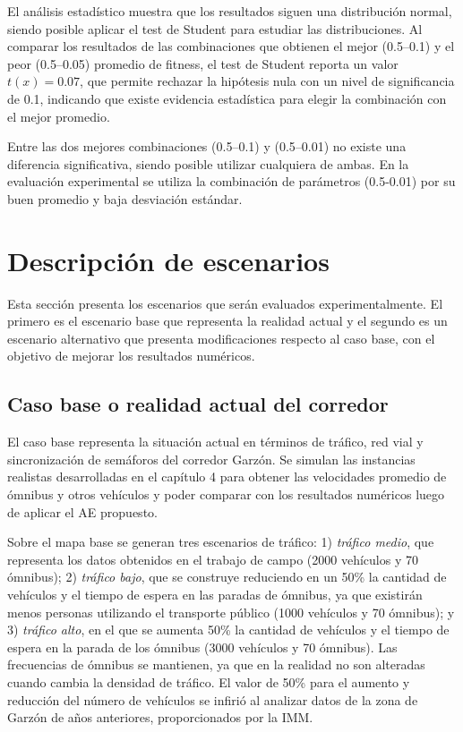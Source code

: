 El análisis estadístico muestra que los resultados siguen una distribución normal, siendo posible aplicar el test de Student para estudiar las distribuciones. Al comparar los resultados de las combinaciones que obtienen el mejor (0.5--0.1) y el peor (0.5--0.05) promedio de fitness, el test de Student reporta un valor $t(x)= 0.07$, que permite rechazar la hipótesis nula con un nivel de significancia de 0.1, indicando que existe evidencia estadística para elegir la combinación con el mejor promedio.

Entre las dos mejores combinaciones (0.5--0.1) y (0.5--0.01) no existe una diferencia significativa, siendo posible utilizar cualquiera de ambas. En la evaluación experimental se utiliza la combinación de parámetros (0.5-0.01) por su buen promedio y baja desviación estándar.


\section{Descripción de escenarios}
Esta sección presenta los escenarios que serán evaluados experimentalmente. El primero es el escenario base que representa la realidad actual y el segundo es un escenario alternativo que presenta modificaciones respecto al caso base, con el objetivo de mejorar los resultados numéricos.

\subsection{Caso base o realidad actual del corredor}
El caso base representa la situación actual en términos de tráfico, red vial y sincronización de semáforos del corredor Garzón. Se simulan las instancias realistas desarrolladas en el capítulo 4 para obtener las velocidades promedio de ómnibus y otros vehículos y poder comparar con los resultados numéricos luego de aplicar el AE propuesto.  

Sobre el mapa base se generan tres escenarios de tráfico: 1) \textit{tráfico medio}, que representa los datos obtenidos en el trabajo de campo (2000 vehículos y 70 ómnibus); 2) \textit{tráfico bajo}, que se construye reduciendo en un 50\% la cantidad de vehículos y el tiempo de espera en las paradas de ómnibus, ya que existirán menos personas utilizando el transporte público (1000 vehículos y 70 ómnibus); y 3)  \textit{tráfico alto}, en el que se aumenta 50\%  la cantidad de vehículos y el tiempo de espera en la parada de los ómnibus (3000 vehículos y 70 ómnibus). Las frecuencias de ómnibus se mantienen, ya que en la realidad no son alteradas cuando cambia la densidad de tráfico. El valor de 50\% para el aumento y reducción del número de vehículos se infirió al analizar datos de la zona de Garzón de años anteriores, proporcionados por la IMM.
 

